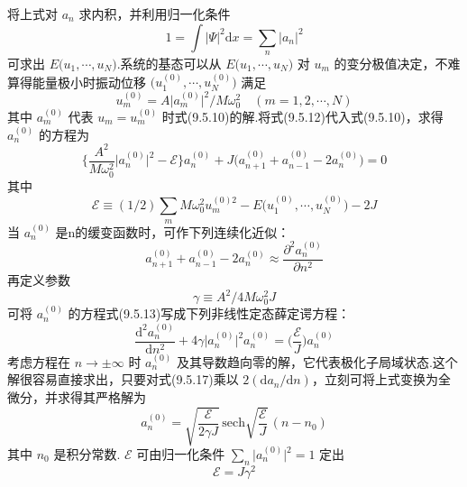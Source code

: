 将上式对 $a_{n}$ 求内积，并利用归一化条件
\begin{equation}
  1=\int|\varPsi|^{2}\mathrm{d}x=\sum_{n}|a_{n}|^{2}
\end{equation}
可求出 $E\bigl(u_{1},\cdots,u_{N}\bigr)$.系统的基态可以从 $E\bigl(u_{1},\cdots,u_{N}\bigr)$ 对 $u_{m}$ 的变分极值决定，不难算得能量极小时振动位移
$\bigl(u_{1}^{(0)},\cdots,u_{N}^{(0)}\bigr)$ 满足
\begin{equation}
  u_{m}^{(0)}=A\bigl|a_{m}^{(0)}\bigr|^{2}/M\omega_{0}^{2}
  \quad\left(m=1,2,\cdots,N\right)
\end{equation}
其中 $a_{m}^{(0)}$ 代表 $u_{m}=u_{m}^{(0)}$ 时式(9.5.10)的解.将式(9.5.12)代入式(9.5.10)，求得 $a_{n}^{(0)}$ 的方程为
\begin{equation}
  \biggl\{\frac{A^{2}}{M\omega_{0}^{2}}
  \bigl|a_{n}^{(0)}\bigr|^{2}-\mathscr{E}\biggr\}a_{n}^{(0)}
  +J\bigl(a_{n+1}^{(0)}+a_{n-1}^{(0)}-2a_{n}^{(0)}\bigr)=0
\end{equation}
其中
\begin{equation}
  \mathscr{E}\equiv\left(1/2\right)\sum_{m}M\omega_{0}^{2}
  u_{m}^{(0)2}
  -E\bigl(u_{1}^{(0)},\cdots,u_{N}^{(0)}\bigr)-2J
\end{equation}
当 $a_{n}^{(0)}$ 是n的缓变函数时，可作下列连续化近似：
\begin{equation}
  a_{n+1}^{(0)}+a_{n-1}^{(0)}-2a_{n}^{(0)}
  \approx\frac{\partial^{2}a_{n}^{(0)}}{\partial n^{2}}
\end{equation}
再定义参数
\begin{equation}
  \gamma\equiv A^{2}/4M\omega_{0}^{2}J
\end{equation}
可将 $a_{n}^{(0)}$ 的方程式(9.5.13)写成下列非线性定态薛定谔方程：
\begin{equation}
  \frac{\mathrm{d}^{2}a_{n}^{(0)}}{\mathrm{d}n^{2}}
  +4\gamma\bigl|a_{n}^{(0)}\bigr|^{2}a_{n}^{(0)}
  =\biggl(\frac{\mathscr{E}}{J}\biggr)a_{n}^{(0)}
\end{equation}
考虑方程在 $n\rightarrow\pm\infty$ 时 $a_{n}^{(0)}$ 及其导数趋向零的解，它代表极化子局域状态.这个解很容易直接求出，只要对式(9.5.17)乘以 $2\left(\mathrm{d}a_{n}/\mathrm{d}n\right)$，立刻可将上式变换为全微分，并求得其严格解为
\begin{equation}
  a_{n}^{(0)}=\sqrt{\frac{\mathscr{E}}{2\gamma J}}\,
  \mathrm{sech}\sqrt{\frac{\mathscr{E}}{J}}\,
  \left(n-n_{0}\right)
\end{equation}
其中 $n_{0}$ 是积分常数. $\mathscr{E}$ 可由归一化条件
$\sum\limits_{n}\bigl|a_{n}^{(0)}\bigr|^{2}=1$ 定出
\begin{equation}
  \mathscr{E}=J\gamma^{2}
\end{equation}
